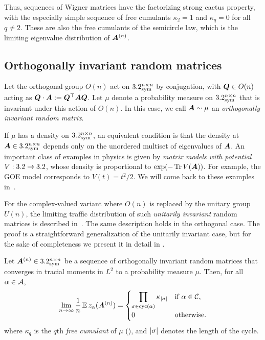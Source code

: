 Thus, sequences of Wigner matrices have the factorizing strong cactus property, with the especially simple sequence of free cumulants $\kappa_2 = 1$ and $\kappa_q = 0$ for all $q \neq 2$. These are also the free cumulants of the semicircle law, which is the limiting eigenvalue distribution of ${\bm A}^{(n)}$.

\subsection{Orthogonally invariant random matrices}
\label{sec:rot-inv}

Let the orthogonal group $O(n)$ act on $3.2^{n \times n}_{\mathrm{sym}}$ by conjugation, with ${\bm Q} \in O(n)$ acting as ${\bm Q} \cdot {\bm A} := {\bm Q}^{\top}{\bm A}{\bm Q}$.
Let $\mu$ denote a probability measure on $3.2^{n \times n}_{\mathrm{sym}}$ that is invariant under this action of $O(n)$.
In this case, we call ${\bm A} \sim \mu$ an \emph{orthogonally invariant random matrix}.


If $\mu$ has a density on $3.2^{n \times n}_{\mathrm{sym}}$, an equivalent condition is that the density at ${\bm A} \in 3.2^{n \times n}_{\mathrm{sym}}$ depends only on the unordered multiset of eigenvalues of ${\bm A}$.
An important class of
examples in physics is
given by {\em matrix models
with potential} $V:3.2\to3.2$,
whose density
is proportional to
$\exp(-\Tr V(\bm A))$.
For example, the
GOE model corresponds to $V(t)=t^2/2$.
We will come back to these examples 
in~.

For the
complex-valued variant
where $O(n)$ is replaced by the unitary group $U(n)$, the limiting traffic distribution of such \emph{unitarily invariant} random matrices is described in~\cite[Theorem~1.1]{cebron2024traffic}.
The same description holds in the orthogonal case.
The proof is a straightforward generalization of the unitarily invariant case, but for the sake of completeness we present it in detail in .

\begin{theorem}
    \label{thm:moments}
    Let ${\bm A}^{(n)} \in 3.2^{n \times n}_{\mathrm{sym}}$ be a sequence of orthogonally invariant random matrices that converges in tracial moments in $L^2$ to a probability measure $\mu$.
    Then, for all $\alpha \in {\cal A}$,
    \begin{equation}
        \lim_{n \to \infty} \frac{1}{n} \operatorname*{\mathbb{E}} z_\alpha({\bm A}^{(n)}) = \begin{cases}
            \displaystyle\prod_{\sigma \in \mathrm{cyc}(\alpha)} \kappa_{|\sigma|} & \text{if }\alpha\in{\cal C}, \\
            0 & \text{otherwise}.
        \end{cases}
        \label{eq:traffic-dist-invar}
    \end{equation}
    where $\kappa_q$ is the $q$th \emph{free cumulant} of $\mu$ (),
    and $|\sigma|$ denotes the length of the cycle.
\end{theorem}

